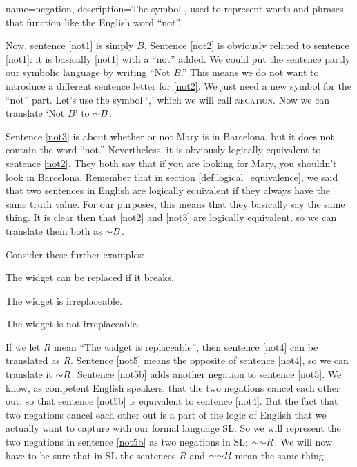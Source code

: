 {
name=negation,
description={The symbol \enot, used to represent words and phrases that function like the English word ``not''.}
}

Now, sentence \ref{not1} is simply $B$. Sentence \ref{not2} is obviously related to sentence \ref{not1}: it is basically \ref{not1} with a ``not'' added. We could put the sentence partly our symbolic language by writing ``Not $B$.'' This means we do not want to introduce a different sentence letter for \ref{not2}. We just need a new symbol for the ``not'' part. Let's use the symbol `\enot,' which we will call \textsc{\gls{negation}}. \label{def:negation} Now we can translate `Not $B$' to $\mathord{\sim} B$. 

Sentence \ref{not3} is about whether or not Mary is in Barcelona, but it does not contain the word ``not.'' Nevertheless, it is obviously logically equivalent to sentence \ref{not2}. They both say that if you are looking for Mary, you shouldn't look in Barcelona. Remember that in section \ref{def:logical_equivalence}, we said that two sentences in English are logically equivalent if they always have the same truth value. For our purposes, this means that they basically say the same thing. It is clear then that \ref{not2} and \ref{not3} are logically equivalent, so we can translate them both as $\mathord{\sim} B$.



Consider these further examples:
\begin{earg}
\item[\ex{not4}] The widget can be replaced if it breaks.
\item[\ex{not5}] The widget is irreplaceable.
\item[\ex{not5b}] The widget is not irreplaceable.
\end{earg}


If we let $R$ mean ``The widget is replaceable'', then sentence \ref{not4} can be translated as $R$. Sentence \ref{not5} means the opposite of sentence \ref{not4}, so we can translate it 
$\mathord{\sim} R$. Sentence \ref{not5b} adds another negation to sentence \ref{not5}. We know, as competent English speakers, that the two negations cancel each other out, so that sentence 
\ref{not5b} is equivalent to sentence \ref{not4}. But the fact that two negations cancel each other out is a part of the logic of English that we actually want to capture with our formal 
language SL. So we will represent the two negations in sentence \ref{not5b} as two negations in SL: $\mathord{\sim} \mathord{\sim} R$. We will now have to be sure that in SL the sentences $R$ and $\mathord{\sim} 
\mathord{\sim} R$ mean the same thing.

